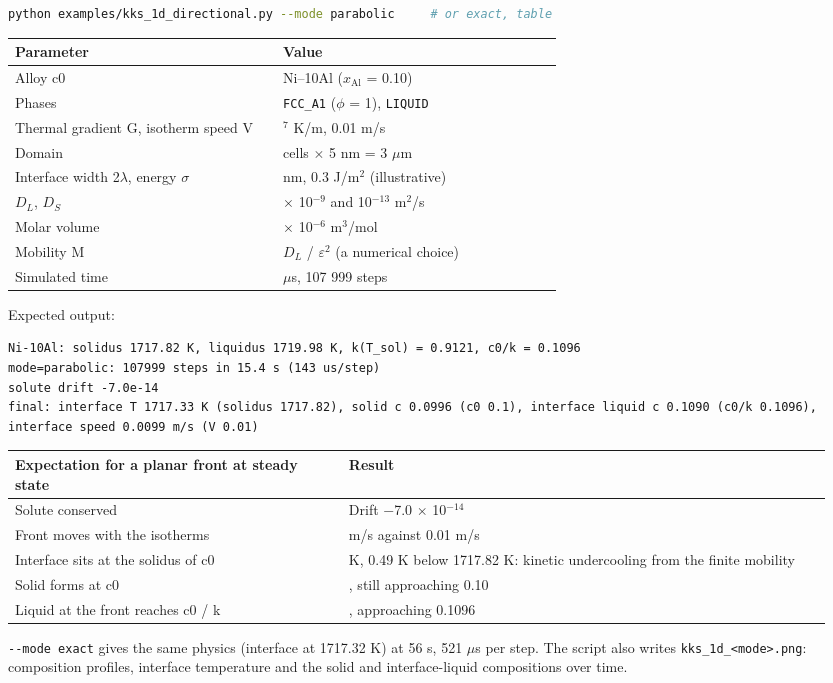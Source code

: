 \documentclass[12pt,a4paper]{article}
\begin{document}
\begin{lstlisting}[basicstyle={\footnotesize\ttfamily},language=bash]
python examples/kks_1d_directional.py --mode parabolic     # or exact, table
\end{lstlisting}
\begingroup\small
\begin{longtable}{>{\raggedright\arraybackslash}p{0.462\linewidth}>{\raggedright\arraybackslash}p{0.485\linewidth}}
\toprule
\textbf{Parameter} & \textbf{Value} \\
\midrule
\endhead
Alloy c0 & Ni--10Al (\(x_{\mathrm{Al}}\) = 0.10) \\
Phases & \texttt{FCC\_\allowbreak{}A1} (\(\phi\) = 1), \texttt{LIQUID} \\
Thermal gradient G, isotherm speed V & 10\(^{7}\) K/m, 0.01 m/s \\
Domain & 600 cells \(\times\) 5 nm = 3 \(\mu\)m \\
Interface width 2\(\lambda\), energy \(\sigma\) & 25 nm, 0.3 J/m\(^{2}\) (illustrative) \\
\(D_{L}\), \(D_{S}\) & 3 \(\times\) 10\(^{-9}\) and 10\(^{-13}\) m\(^{2}\)/s \\
Molar volume & 7.0 \(\times\) 10\(^{-6}\) m\(^{3}\)/mol \\
Mobility M & \(D_{L}\) / \(\varepsilon ^{2}\) (a numerical choice) \\
Simulated time & 180 \(\mu\)s, 107 999 steps \\
\bottomrule
\end{longtable}
\endgroup
Expected output:

\begin{lstlisting}[basicstyle={\scriptsize\ttfamily}]
Ni-10Al: solidus 1717.82 K, liquidus 1719.98 K, k(T_sol) = 0.9121, c0/k = 0.1096
mode=parabolic: 107999 steps in 15.4 s (143 us/step)
solute drift -7.0e-14
final: interface T 1717.33 K (solidus 1717.82), solid c 0.0996 (c0 0.1), interface liquid c 0.1090 (c0/k 0.1096), interface speed 0.0099 m/s (V 0.01)
\end{lstlisting}
\begingroup\small
\begin{longtable}{>{\raggedright\arraybackslash}p{0.389\linewidth}>{\raggedright\arraybackslash}p{0.558\linewidth}}
\toprule
\textbf{Expectation for a planar front at steady state} & \textbf{Result} \\
\midrule
\endhead
Solute conserved & Drift \(-\)7.0 \(\times\) 10\(^{-14}\) \\
Front moves with the isotherms & 0.0099 m/s against 0.01 m/s \\
Interface sits at the solidus of c0 & 1717.33 K, 0.49 K below 1717.82 K: kinetic undercooling from the finite mobility \\
Solid forms at c0 & 0.0996, still approaching 0.10 \\
Liquid at the front reaches c0 / k & 0.1090, approaching 0.1096 \\
\bottomrule
\end{longtable}
\endgroup
\texttt{-{}-{}mode exact} gives the same physics (interface at 1717.32 K) at 56 s, 521 \(\mu\)s per step. The script also writes \texttt{kks\_\allowbreak{}1d\_\allowbreak{}\textless{}mode\textgreater{}.\allowbreak{}png}: composition profiles, interface temperature and the solid and interface-liquid compositions over time.
\end{document}
